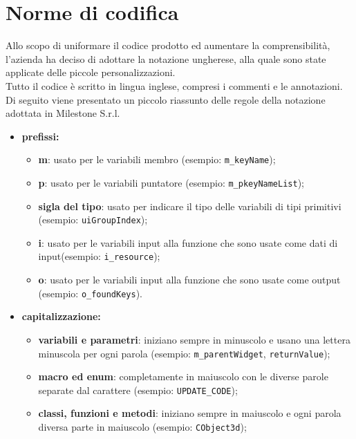 \section{Norme di codifica}

Allo scopo di uniformare il codice prodotto ed aumentare la comprensibilità, l'azienda ha deciso di adottare la notazione ungherese, alla quale sono state applicate delle piccole personalizzazioni.\\

Tutto il codice è scritto in lingua inglese, compresi i commenti e le annotazioni. Di seguito viene presentato un piccolo riassunto delle regole della notazione adottata in Milestone S.r.l.\\

\begin{itemize}
	\item \textbf{prefissi:}
	\begin{itemize}
		\item \textbf{m}: usato per le variabili membro (esempio: \texttt{m\_keyName});
		\item \textbf{p}: usato per le variabili puntatore (esempio: \texttt{m\_pkeyNameList});
		\item \textbf{sigla del tipo}: usato per indicare il tipo delle variabili di tipi primitivi (esempio: \texttt{uiGroupIndex});
		
		\item \textbf{i}: usato per le variabili input alla funzione che sono usate come dati di input(esempio: \texttt{i\_resource});
		
		\item \textbf{o}: usato per le variabili input alla funzione che sono usate come output (esempio: \texttt{o\_foundKeys}).
	\end{itemize}
	\item \textbf{capitalizzazione:}
	\begin{itemize}
		\item \textbf{variabili e parametri}: iniziano sempre in minuscolo e usano una lettera minuscola per ogni parola (esempio: \texttt{m\_parentWidget}, \texttt{returnValue});
		\item \textbf{macro ed enum}: completamente in maiuscolo con le diverse parole separate dal carattere \sq{\_} (esempio: \texttt{UPDATE\_CODE});
		\item \textbf{classi, funzioni e metodi}: iniziano sempre in maiuscolo e ogni parola diversa parte in maiuscolo (esempio: \texttt{CObject3d});
	\end{itemize}
\end{itemize}

